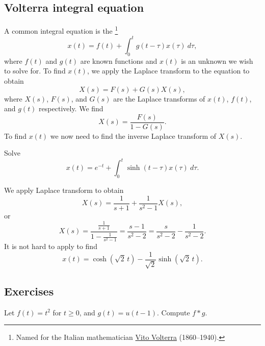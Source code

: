 \subsection{Volterra integral equation}

A common integral equation
is the \emph{}%
\footnote{Named for the Italian mathematician
\href{https://en.wikipedia.org/wiki/Vito_Volterra}{Vito Volterra}
(1860--1940).}
\begin{equation*}
x(t) = f(t) + \int_0^t g(t-\tau) x(\tau) ~ d\tau ,
\end{equation*}
where $f(t)$ and $g(t)$ are known functions and $x(t)$ is an unknown we
wish to solve for.
To find $x(t)$,
we apply the Laplace transform to the equation to obtain 
\begin{equation*}
X(s) = F(s) + G(s) X(s) ,
\end{equation*}
where $X(s)$, $F(s)$, and $G(s)$ are the Laplace transforms of $x(t)$, $f(t)$, and
$g(t)$ respectively.  We find
\begin{equation*}
X(s) = \frac{F(s)}{1-G(s)} .
\end{equation*}
To find $x(t)$ we now need to find the 
inverse Laplace transform of $X(s)$.

\begin{example}
Solve
\begin{equation*}
x(t) =  e^{-t} + \int_0^t \sinh(t-\tau) x(\tau) ~ d\tau .
\end{equation*}

We apply Laplace transform to obtain
\begin{equation*}
X(s) = \frac{1}{s+1} + \frac{1}{s^2-1} X(s) ,
\end{equation*}
or
\begin{equation*}
X(s) = \frac{\frac{1}{s+1}}{1- \frac{1}{s^2-1}}
=
\frac{s-1}{s^2 - 2}
=
\frac{s}{s^2 - 2}
-
\frac{1}{s^2 - 2} .
\end{equation*}
It is not hard to apply  to find
\begin{equation*}
x(t) = \cosh (\! \sqrt{2} \, t) -
\frac{1}{\sqrt{2}} \sinh (\!  \sqrt{2}\, t ).
\end{equation*}
\end{example}

\subsection{Exercises}

\begin{exercise}
Let $f(t) = t^2$ for $t \geq 0$, and $g(t) = u(t-1)$.  Compute
$f * g$.
\end{exercise}

